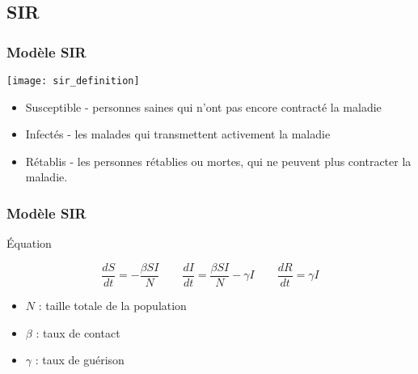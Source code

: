 \subsection{SIR}

\begin{frame}
        \frametitle{Modèle SIR}

        \begin{center}
                \texttt{[image: sir\_definition]}
        \end{center}


        \begin{itemize}
                \item Susceptible - personnes saines qui n'ont pas encore contracté la maladie
                \item Infectés - les malades qui transmettent activement la maladie
                \item Rétablis - les personnes rétablies ou mortes, qui ne peuvent plus contracter la maladie.
        \end{itemize}


\end{frame}

\begin{frame}
        \frametitle{Modèle SIR}

        \begin{alertblock}{Équation}

                $$ \frac{dS}{dt} = -\frac{\beta SI}{N} \qquad \frac{dI}{dt} = \frac{\beta SI}{N} - \gamma I \qquad \frac{dR}{dt} = \gamma I $$

                \begin{itemize}
                        \item $N$ : taille totale de la population
                        \item $\beta$ : taux de contact
                        \item $\gamma$ : taux de guérison
                \end{itemize}

        \end{alertblock}
\end{frame}

